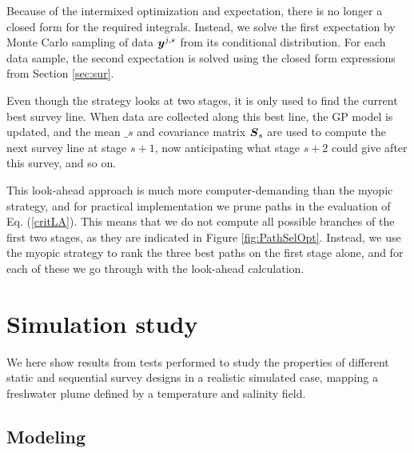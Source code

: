 \documentclass[aoas]{imsart}
\begin{document}
Because of the intermixed optimization and expectation, there is no longer a closed form for the required integrals. Instead, we solve the first expectation by Monte Carlo sampling of data ${\boldsymbol y}^{j,s}$ from its conditional distribution. For each data sample, the second expectation is solved using the closed form expressions from Section \ref{sec:sur}. 

Even though the strategy looks at two stages, it is only used to find the current best survey line. When data are collected along this best line, the GP model is updated, and the mean $\bm_{s}$ and covariance matrix ${\boldsymbol S}_{s}$ are used to compute the next survey line at stage $s+1$, now anticipating what stage $s+2$ could give after this survey, and so on. 

This look-ahead approach is much more computer-demanding than the myopic strategy, and for practical implementation we prune paths in the evaluation of Eq. (\ref{critLA}). This means that we do not compute all possible branches of the first two stages, as they are indicated in Figure \ref{fig:PathSelOpt}. Instead, we use the myopic strategy to rank the three best paths on the first stage alone, and for each of these we go through with the look-ahead calculation. 

\section{Simulation study}\label{sec:simulations}
We here show results from tests performed to study the properties of different static and sequential survey designs in a realistic simulated case, mapping a freshwater plume defined by a temperature and salinity field. 

\subsection{Modeling}
\end{document}

